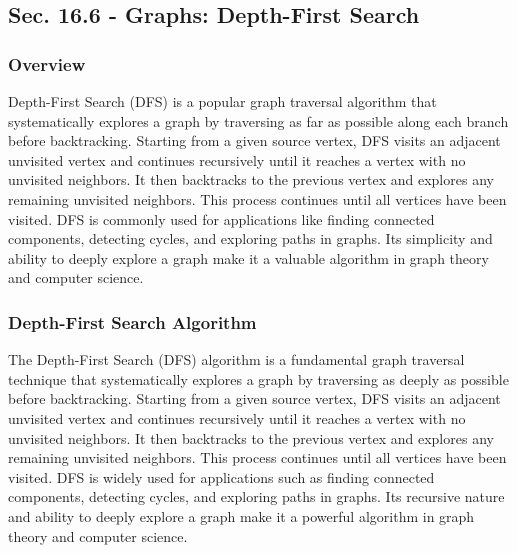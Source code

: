 \subsection*{Sec. 16.6 - Graphs: Depth-First Search}

\subsubsection{Overview}

Depth-First Search (DFS) is a popular graph traversal algorithm that systematically explores a graph by traversing as far as possible along each branch before backtracking. Starting from a given source vertex, DFS visits an adjacent unvisited 
vertex and continues recursively until it reaches a vertex with no unvisited neighbors. It then backtracks to the previous vertex and explores any remaining unvisited neighbors. This process continues until all vertices have been visited. 
DFS is commonly used for applications like finding connected components, detecting cycles, and exploring paths in graphs. Its simplicity and ability to deeply explore a graph make it a valuable algorithm in graph theory and computer science.

\subsubsection{Depth-First Search Algorithm}

The Depth-First Search (DFS) algorithm is a fundamental graph traversal technique that systematically explores a graph by traversing as deeply as possible before backtracking. Starting from a given source vertex, DFS visits an adjacent unvisited 
vertex and continues recursively until it reaches a vertex with no unvisited neighbors. It then backtracks to the previous vertex and explores any remaining unvisited neighbors. This process continues until all vertices have been visited. DFS is 
widely used for applications such as finding connected components, detecting cycles, and exploring paths in graphs. Its recursive nature and ability to deeply explore a graph make it a powerful algorithm in graph theory and computer science.

